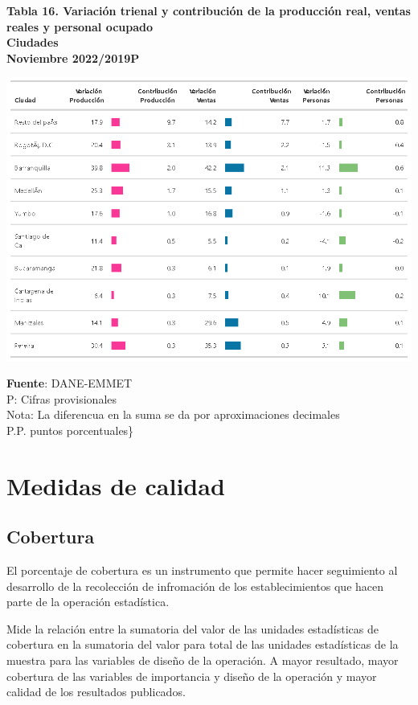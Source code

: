 \documentclass[
]{article}
\begin{document}
\newpage

\textbf{Tabla 16. Variación trienal y contribución de la producción
real, ventas reales y personal ocupado}\\
\textbf{Ciudades}\\
\textbf{Noviembre 2022/2019P}

\begin{center}\includegraphics[width=12.58in]{tabla16_1} \end{center}

\textbf{Fuente}: DANE-EMMET\\
P: Cifras provisionales\\
Nota: La diferencua en la suma se da por aproximaciones decimales\\
P.P. puntos porcentuales\}

\hypertarget{medidas-de-calidad}{%
\section{Medidas de calidad}\label{medidas-de-calidad}}

\hypertarget{cobertura}{%
\subsection{Cobertura}\label{cobertura}}

El porcentaje de cobertura es un instrumento que permite hacer
seguimiento al desarrollo de la recolección de infromación de los
establecimientos que hacen parte de la operación estadística.

Mide la relación entre la sumatoria del valor de las unidades
estadísticas de cobertura en la sumatoria del valor para total de las
unidades estadísticas de la muestra para las variables de diseño de la
operación. A mayor resultado, mayor cobertura de las variables de
importancia y diseño de la operación y mayor calidad de los resultados
publicados.
\end{document}

